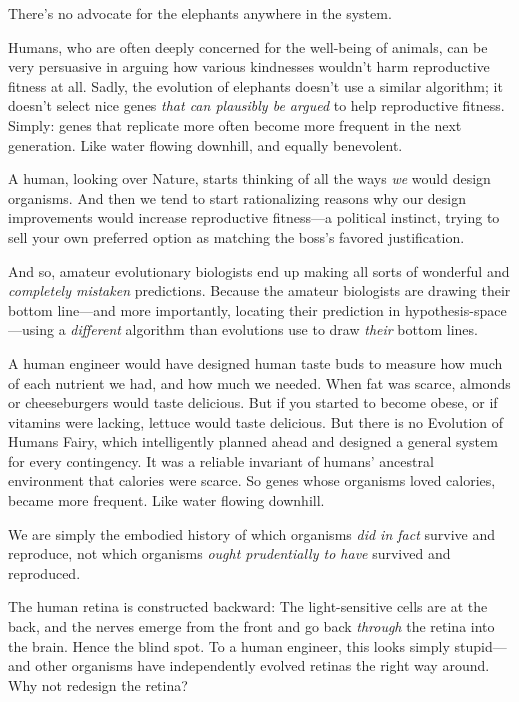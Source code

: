  There's no advocate for the elephants anywhere in
the system.


 Humans, who are often deeply concerned for the well-being of
animals, can be very persuasive in arguing how various kindnesses
wouldn't harm reproductive fitness at all. Sadly, the
evolution of elephants doesn't use a similar algorithm;
it doesn't select nice genes \textit{that can plausibly
be argued} to help reproductive fitness. Simply: genes that replicate
more often become more frequent in the next generation. Like water
flowing downhill, and equally benevolent.


 A human, looking over Nature, starts thinking of all the ways
\textit{we} would design organisms. And then we tend to start
rationalizing reasons why our design improvements would increase
reproductive fitness---a political instinct, trying to sell your own
preferred option as matching the boss's favored
justification.


 And so, amateur evolutionary biologists end up making all sorts of
wonderful and \textit{completely mistaken} predictions. Because the
amateur biologists are drawing their bottom line---and more
importantly, locating their prediction in hypothesis-space---using a
\textit{different} algorithm than evolutions use to draw \textit{their}
bottom lines.


 A human engineer would have designed human taste buds to measure
how much of each nutrient we had, and how much we needed. When fat was
scarce, almonds or cheeseburgers would taste delicious. But if you
started to become obese, or if vitamins were lacking, lettuce would
taste delicious. But there is no Evolution of Humans Fairy, which
intelligently planned ahead and designed a general system for every
contingency. It was a reliable invariant of humans'
ancestral environment that calories were scarce. So genes whose
organisms loved calories, became more frequent. Like water flowing
downhill.

{
 We are simply the embodied history of which organisms \textit{did
in fact} survive and reproduce, not which organisms \textit{ought
prudentially to have} survived and reproduced.}


 The human retina is constructed backward: The light-sensitive
cells are at the back, and the nerves emerge from the front and go back
\textit{through} the retina into the brain. Hence the blind spot. To a
human engineer, this looks simply stupid---and other organisms have
independently evolved retinas the right way around. Why not redesign
the retina?



